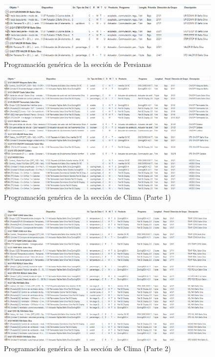 \begin{figure}[H]
\includegraphics[width=1.55\textwidth]{figures/prog_pers.png}   
\caption{Programación genérica de la sección de Persianas}
\label{fig:prog_pers}
\end{figure}

\begin{landscape}
\begin{figure}[H]
\includegraphics[width=1.65\textwidth]{figures/prog_clima1.png}   
\caption{Programación genérica de la sección de Clima (Parte 1)}
\label{fig:prog_clima1}
\end{figure}
\begin{figure}[H]
\includegraphics[width=1.65\textwidth]{figures/prog_clima2.png}   \caption{Programación genérica de la sección de Clima (Parte 2)}
\label{fig:prog_clima2}
\end{figure}
\end{landscape}

